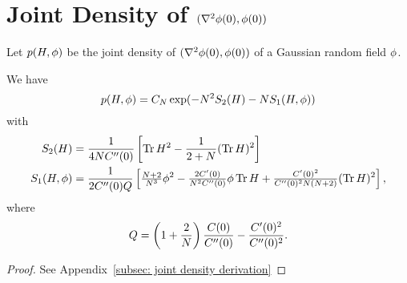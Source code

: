 \section{Joint Density of \texorpdfstring{\((\nabla^2\phi(0), \phi(0))\)}{(hessian ϕ(0), ϕ(0))}}

Let \(p(H, \phi)\) be the joint density of \((\nabla^2\phi(0), \phi(0))\) of
a Gaussian random field \(\phi\).

\begin{lemma}\label{lem: joint density}
	We have
	\[
		p(H, \phi) = C_N \exp(-N^2 S_2(H) - N S_1(H, \phi))
	\]
	with
	\begin{align*}
		S_2(H)
		&= \frac{1}{4NC''(0)}\left[
			\operatorname{Tr} H^2 - \frac1{2+N}(\operatorname{Tr} H)^2
		\right]
		\\
		S_1(H,\phi)
		&= \frac1{2C''(0)Q}\left[
			\tfrac{N+2}{N^3}\phi^2
			- \tfrac{2C'(0)}{N^2C''(0)}\phi\operatorname{Tr} H
			+ \tfrac{C'(0)^2}{C''(0)^2N(N+2)}(\operatorname{Tr} H)^2
		\right],
	\end{align*}
	where
	\[
		Q = \left(1+\frac2{N}\right)
		\frac{C(0)}{C''(0)} - \frac{C'(0)^2}{C''(0)^2}.
	\]
\end{lemma}
\begin{proof}
	See Appendix~\ref{subsec: joint density derivation}
\end{proof}